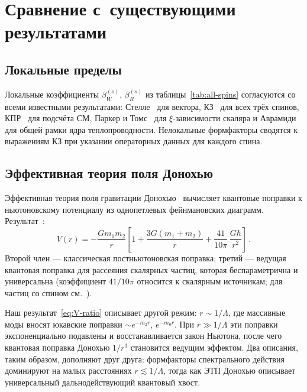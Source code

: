 \documentclass[aps,prd,twocolumn,superscriptaddress,nofootinbib,floatfix]{revtex4-2}
\theoremstyle{definition}
\theoremstyle{remark}
\begin{document}
\section{Сравнение с~существующими результатами}
\label{sec:comparison}

\subsection{Локальные пределы}

Локальные коэффициенты $\beta_W^{(s)}$, $\beta_R^{(s)}$
из таблицы~\ref{tab:all-spins} согласуются со всеми известными результатами:
Стелле~\cite{Stelle:1976gc} для вектора, КЗ~\cite{Codello:2012kq} для
всех трёх спинов, КПР~\cite{Codello:2008vh} для подсчёта СМ, Паркер и
Томс~\cite{Parker:2009uva} для $\xi$-зависимости скаляра и
Аврамиди~\cite{Avramidi:2000bm} для общей рамки ядра теплопроводности.
Нелокальные формфакторы сводятся к выражениям КЗ при указании операторных
данных для каждого спина.

\subsection{Эффективная теория поля Донохью}
\label{sec:donoghue}

Эффективная теория поля гравитации
Донохью~\cite{Donoghue:1993eb,Donoghue:1994dn,BjerrumBohr:2002kt,Donoghue:2022eay}
вычисляет квантовые поправки к ньютоновскому потенциалу из однопетлевых
фейнмановских диаграмм. Результат~\cite{BjerrumBohr:2002kt}:
\begin{equation}
  V(r) = -\frac{Gm_1 m_2}{r}\left[1 + \frac{3G(m_1 + m_2)}{r}
    + \frac{41}{10\pi}\,\frac{G\hbar}{r^2}\right]\,.
  \label{eq:donoghue}
\end{equation}
Второй член --- классическая постньютоновская поправка; третий ---
ведущая квантовая поправка для рассеяния скалярных частиц, которая
беспараметрична и универсальна (коэффициент $41/10\pi$ относится к
скалярным источникам; для частиц со спином
см.~\cite{BjerrumBohr:2002kt}).

Наш результат~\eqref{eq:V-ratio} описывает другой режим:
$r \sim 1/\Lambda$, где массивные моды вносят юкавские поправки
$\sim e^{-m_2 r}$, $e^{-m_0 r}$. При $r \gg 1/\Lambda$ эти поправки
экспоненциально подавлены и восстанавливается закон Ньютона, после чего
квантовая поправка Донохью $1/r^3$ становится ведущим эффектом. Два
описания, таким образом, дополняют друг друга: формфакторы спектрального
действия доминируют на малых расстояниях $r \lesssim 1/\Lambda$, тогда
как ЭТП Донохью описывает универсальный дальнодействующий квантовый хвост.
\end{document}
